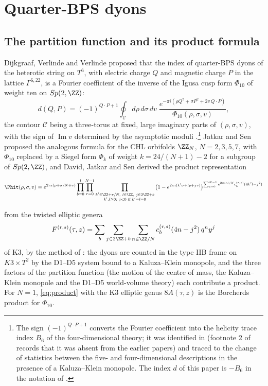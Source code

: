 \section{Quarter-BPS dyons}\label{sec:dyons}

\subsection{The partition function and its product formula}\label{ssec:chl}

Dijkgraaf, Verlinde and Verlinde \cite{DVV97} proposed that the index of quarter-BPS dyons of the heterotic string on $T^6$, with electric charge $Q$ and magnetic charge $P$ in the lattice $\Gamma^{6,22}$, is a Fourier coefficient of the inverse of the Igusa cusp form $\Phi_{10}$ of weight ten on $Sp(2,\ZZ)$:
\begin{equation}\label{eq:dvv}
d(Q,P) = (-1)^{Q\cdot P+1}\oint_{\mathcal C} d\rho\,d\sigma\,dv\; \frac{e^{-\pi i(\rho Q^2 + \sigma P^2 + 2 v\, Q\cdot P)}}{\Phi_{10}(\rho,\sigma,v)} ,
\end{equation}
the contour $\mathcal C$ being a three-torus at fixed, large imaginary parts of $(\rho,\sigma,v)$, with the sign of $\operatorname{Im} v$ determined by the asymptotic moduli \cite{Sen07walls}.\footnote{The sign $(-1)^{Q\cdot P+1}$ converts the Fourier coefficient into the helicity trace index $B_6$ of the four-dimensional theory; it was identified in \cite{Sen07walls,Sen07twocentred} (footnote 2 of \cite{Sen07twocentred} records that it was absent from the earlier papers) and traced to the change of statistics between the five- and four-dimensional descriptions in the presence of a Kaluza--Klein monopole. The index $d$ of this paper is $-B_6$ in the notation of \cite{Sen11positivity}.} Jatkar and Sen \cite{JatkarSen06} proposed the analogous formula for the CHL orbifolds $\ZZ_N$, $N=2,3,5,7$, with $\Phi_{10}$ replaced by a Siegel form $\Phi_k$ of weight $k = 24/(N+1)-2$ for a subgroup of $Sp(2,\ZZ)$, and David, Jatkar and Sen \cite{DJS06,DJS07} derived the product representation
\begin{widetext}
\begin{equation}\label{eq:product}
\Phit(\rho,\sigma,v) = e^{2\pi i(\rho + \sigma/N + v)}\prod_{b=0}^{1}\prod_{r=0}^{N-1}\prod_{\substack{k'\in\ZZ+r/N,\ l\in\ZZ,\ j\in 2\ZZ+b\\ k',l\ge 0;\ j<0 \text{ if } k'=l=0}}\big(1 - e^{2\pi i(k'\sigma + l\rho + jv)}\big)^{\sum_{s=0}^{N-1} e^{2\pi i s l/N} c^{(r,s)}_b(4k'l-j^2)}
\end{equation}
\end{widetext}
from the twisted elliptic genera
\[
F^{(r,s)}(\tau,z) = \sum_b\sum_{j\in 2\ZZ+b}\sum_{n\in\ZZ/N} c^{(r,s)}_b(4n-j^2)\, q^n y^j
\]
of K3, by the method of \cite{DVV97}: the dyons are counted in the type IIB frame on $K3\times T^2$ by the D1--D5 system bound to a Kaluza--Klein monopole, and the three factors of the partition function (the motion of the centre of mass, the Kaluza--Klein monopole and the D1--D5 world-volume theory) each contribute a product. For $N=1$, \eqref{eq:product} with the K3 elliptic genus $8A(\tau,z)$ is the Borcherds product for $\Phi_{10}$.

